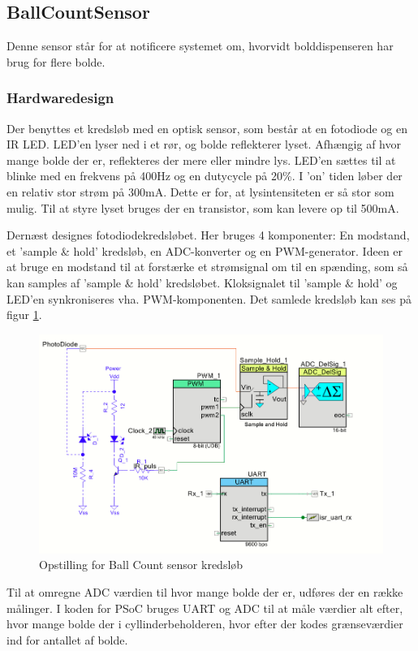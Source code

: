 \documentclass[Rapport/Rapport_main.tex]{subfiles}
\begin{document}
\subsection{BallCountSensor}\label{sec:BallCountSensor}
Denne sensor står for at notificere systemet om, hvorvidt bolddispenseren har brug for flere bolde.

\subsubsection{Hardwaredesign}
Der benyttes et kredsløb med en optisk sensor, som består at en fotodiode og en IR LED. LED'en lyser ned i et rør, og bolde reflekterer lyset. Afhængig af hvor mange bolde der er, reflekteres der mere eller mindre lys. LED'en sættes til at blinke med en frekvens på 400Hz og en dutycycle på 20\%. I 'on' tiden løber der en relativ stor strøm på 300mA. Dette er for, at lysintensiteten er så stor som mulig. Til at styre lyset bruges der en transistor, som kan levere op til 500mA. 

Dernæst designes fotodiodekredsløbet. Her bruges 4 komponenter: En modstand, et 'sample \& hold' kredsløb, en ADC-konverter og en PWM-generator. Ideen er at bruge en modstand til at forstærke et strømsignal om til en spænding, som så kan samples af 'sample \& hold' kredsløbet. Kloksignalet til 'sample \& hold' og LED'en synkroniseres vha. PWM-komponenten. Det samlede kredsløb kan ses på figur \ref{fig:PSoC_TopDesign}.

\begin{figure}[H]
    \centering
    \includegraphics[width=1\textwidth]{Rapport/BallDispenser/BallCountSensor/graphics/Opstilling2.png}
    \caption{Opstilling for Ball Count sensor kredsløb}
    \label{fig:PSoC_TopDesign}
\end{figure}
Til at omregne ADC værdien til hvor mange bolde der er, udføres der en række målinger. I koden for PSoC bruges UART og ADC til at måle værdier alt efter, hvor mange bolde der i cyllinderbeholderen, hvor efter der kodes grænseværdier ind for antallet af bolde.
\end{document}

